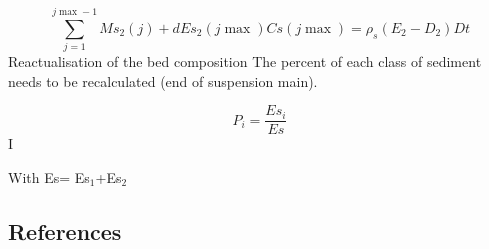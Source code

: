 \begin{equation*}
\sum\limits_{j=1}^{j\max -1}Ms_{2} (j) +dEs_{2} (j\max )Cs(j\max )=\rho _{s}
(E_{2} -D_{2} )Dt 
\end{equation*}
Reactualisation of the bed composition\newline
The percent of each class of sediment needs to be recalculated (end of
suspension main).

\begin{equation*}
P_{i} =\frac{Es_{i} }{Es} 
\end{equation*}%
I

With Es= Es$_{1}$+Es$_{2}$\newline




\subsection*{References}

